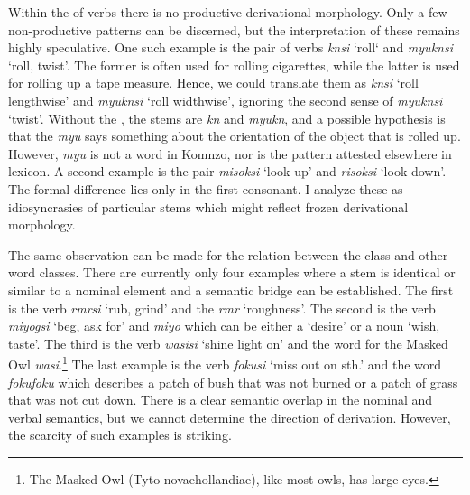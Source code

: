 Within the  of verbs there is no productive derivational morphology. Only a few non-productive patterns can be discerned, but the interpretation of these remains highly speculative. One such example is the pair of verbs \emph{knsi} `roll` and \emph{myuknsi} `roll, twist'. The former is often used for rolling cigarettes, while the latter is used for rolling up a tape measure. Hence, we could translate them as \emph{knsi} `roll lengthwise' and \emph{myuknsi} `roll widthwise', ignoring the second sense of \emph{myuknsi} `twist'. Without the , the stems are \emph{kn} and \emph{myukn}, and a possible hypothesis is that the \emph{myu} says something about the orientation of the object that is rolled up. However, \emph{myu} is not a word in Komnzo, nor is the pattern attested elsewhere in  lexicon. A second example is the pair \emph{misoksi} `look up' and \emph{risoksi} `look down'. The formal difference lies only in the first consonant. I analyze these as idiosyncrasies of particular stems which might reflect frozen derivational morphology.%

The same observation can be made for the relation between the  class and other word classes. There are currently only four examples where a  stem is identical or similar to a nominal element and a semantic bridge can be established. The first is the verb \emph{rmrsi} `rub, grind' and the  \emph{rmr} `roughness'. The second is the verb \emph{miyogsi} `beg, ask for' and \emph{miyo} which can be either a  `desire' or a noun `wish, taste'. The third is the verb \emph{wasisi} `shine light on' and the word for the Masked Owl \emph{wasi}.\footnote{The Masked Owl (Tyto novaehollandiae), like most owls, has large eyes.} The last example is the verb \emph{fokusi} `miss out on sth.' and the word \emph{fokufoku} which describes a patch of bush that was not burned or a patch of grass that was not cut down. There is a clear semantic overlap in the nominal and verbal semantics, but we cannot determine the direction of derivation. However, the scarcity of such examples is striking.%

